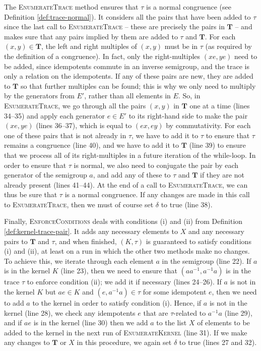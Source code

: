 The \textsc{EnumerateTrace} method ensures that $\tau$ is a normal congruence
(see Definition \ref{def:trace-normal}).  It considers all the pairs that have
been added to $\tau$ since the last call to \textsc{EnumerateTrace} -- these are
precisely the pairs in $\mathbf{T}$ -- and makes sure that any pairs implied by
them are added to $\tau$ and $\mathbf{T}$.  For each $(x,y) \in \mathbf{T}$, the
left and right multiples of $(x,y)$ must be in $\tau$ (as required by the
definition of a congruence).  In fact, only the right-multiples $(xe, ye)$ need
to be added, since idempotents commute in an inverse semigroup, and the trace is
only a relation on the idempotents.  If any of these
pairs are new, they are added to $\mathbf{T}$ so that further multiples can be
found; this is why we only need to multiply by the generators from $E'$, rather
than all elements in $E$.
So, in \textsc{EnumerateTrace}, we go through all the pairs $(x,y)$ in
$\mathbf{T}$ one at a time (lines 34--35) and apply each generator $e \in E'$ to
its right-hand side to make the pair $(xe, ye)$ (lines 36--37), which is equal
to $(ex, ey)$ by commutativity.  For each one of these pairs that is not already
in $\tau$, we have to add it to $\tau$ to ensure that $\tau$ remains a
congruence (line 40), and we have to add it to $\mathbf{T}$ (line 39) to ensure
that we process all of its right-multiples in a future iteration of the
while-loop.  In order to ensure that $\tau$ is normal, we also need to conjugate
the pair by each generator of the semigroup $a$, and add any of these to $\tau$
and $\mathbf{T}$ if they are not already present (lines 41--44).  At the end of
a call to \textsc{EnumerateTrace}, we can thus be sure that $\tau$ is a normal
congruence.  If any changes are made in this call to \textsc{EnumerateTrace},
then we must of course set $\delta$ to true (line 38).

Finally, \textsc{EnforceConditions} deals with conditions (i) and (ii) from
Definition \ref{def:kernel-trace-pair}.  It adds any necessary elements to $X$
and any necessary pairs to $\mathbf{T}$ and $\tau$, and when finished,
$(K,\tau)$ is guaranteed to satisfy conditions (i) and (ii), at least on a run
in which the other two methods make no changes.  To achieve this, we iterate
through each element $a$ in the semigroup (line 22).  If $a$ is in the kernel
$K$ (line 23), then we need to ensure that $(aa^{-1}, a^{-1}a)$ is in the trace
$\tau$ to enforce condition (ii); we add it if necessary (lines 24--26).  If $a$
is not in the kernel $K$ but $ae \in K$ and $(e, a^{-1}a) \in \tau$ for some
idempotent $e$, then we need to add $a$ to the kernel in order to satisfy
condition (i).  Hence, if $a$ is not in the kernel (line 28), we check any
idempotents $e$ that are $\tau$-related to $a^{-1}a$ (line 29), and if $ae$ is
in the kernel (line 30) then we add $a$ to the list $X$ of elements to be added
to the kernel in the next run of \textsc{EnumerateKernel} (line 31).  If we make
any changes to $\mathbf{T}$ or $X$ in this procedure, we again set $\delta$ to
true (lines 27 and 32).

